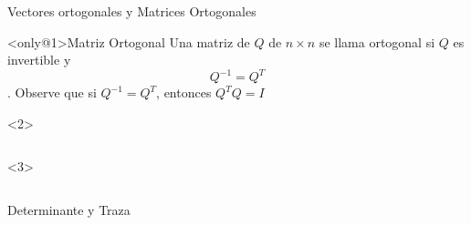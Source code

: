\begin{frame}{Vectores ortogonales y  Matrices Ortogonales}
  
  \begin{block}<only@1>{Matriz Ortogonal}\justifying
    Una matriz de $Q$ de $n\times n$ se llama \alert{ortogonal} si $Q$ es invertible y \[Q^{-1} = Q^{T} \]. Observe que si $Q^{-1} = Q^{T}$, entonces $Q^TQ = I$
  \end{block}

  \begin{onlyenv}<2>
    \begin{columns}[t]
      
      
    \end{columns}
  \end{onlyenv}
    \begin{onlyenv}<3>
    \begin{columns}[t]
      
      
    \end{columns}
  \end{onlyenv}

\end{frame}

\begin{frame}{Determinante y Traza}
  \only<1>{}
\end{frame}

